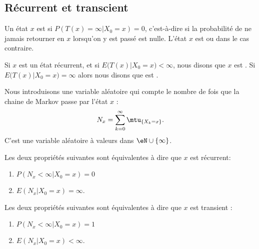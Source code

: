 \subsection{Récurrent et transcient}

\begin{definition}\label{DefWknULk}
	Un état \( x\) est  si \( P(T(x)=\infty|X_0=x)=0\), c'est-à-dire si la probabilité de ne jamais retourner en \( x\) lorsqu'on y est passé est nulle. L'état \( x\) est  ou  dans le cas contraire.

	Si \( x\) est un état récurrent, et si \( E\big( T(x)|X_0=x \big)<\infty\), nous disons que \( x\) est . Si \( E\big( T(x)|X_0=x \big)=\infty\) alors nous disons que est .
\end{definition}

Nous introduisons une variable aléatoire qui compte le nombre de fois que la chaine de Markov passe par l'état \( x\) :
\begin{equation}    \label{EqDefNxmtuXkn}
	N_x=\sum_{k=0}^{\infty}\mtu_{\{ X_k=x\}}.
\end{equation}
C'est une variable aléatoire à valeurs dans \( \eN\cup\{ \infty \}\).

\begin{proposition} \label{PropEquivEPrecuequiv}
	Les deux propriétés suivantes sont équivalentes à dire que \( x\) est récurrent:
	\begin{enumerate}
		\item
		      \( P(N_x<\infty|X_0=x)=0\)
		\item
		      \( E(N_x|X_0=x)=\infty\).
	\end{enumerate}
	Les deux propriétés suivantes sont équivalentes à dire que \( x\) est transient :
	\begin{enumerate}
		\item   \label{ItemiMnGpD}
		      \( P(N_x<\infty|X_0=x)=1\)
		\item
		      \( E(N_x|X_0=x)<\infty\).
	\end{enumerate}
\end{proposition}


